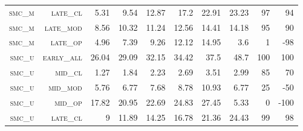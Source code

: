 \begin{landscape}
\begin{table}[!htbp]
\begin{tabular}{@{}rrrrrrr|rrr@{}}
\footnotesize \textsc{smc\_m}      & \footnotesize \textsc{late\_cl  }        & \footnotesize  5.31        & \footnotesize 9.54    & \footnotesize 12.87     & \footnotesize 17.2             & \footnotesize 22.91     & \footnotesize 23.23    & \footnotesize 97    & \footnotesize 94      \\
\footnotesize \textsc{smc\_m}      & \footnotesize \textsc{late\_mod }        & \footnotesize  8.56        & \footnotesize 10.32   & \footnotesize 11.24     & \footnotesize 12.56            & \footnotesize 14.41     & \footnotesize 14.18    & \footnotesize 95    & \footnotesize 90      \\
\footnotesize \textsc{smc\_m}      & \footnotesize \textsc{late\_op  }        & \footnotesize  4.96        & \footnotesize 7.39    & \footnotesize 9.26      & \footnotesize 12.12            & \footnotesize 14.95     & \footnotesize 3.6      & \footnotesize 1     & \footnotesize -98      \\
\footnotesize \textsc{smc\_u}      & \footnotesize \textsc{early\_all}        & \footnotesize  26.04       & \footnotesize 29.09   & \footnotesize 32.15     & \footnotesize 34.42            & \footnotesize 37.5      & \footnotesize 48.7     & \footnotesize 100   & \footnotesize 100      \\
\footnotesize \textsc{smc\_u}      & \footnotesize \textsc{mid\_cl   }        & \footnotesize  1.27        & \footnotesize 1.84    & \footnotesize 2.23      & \footnotesize 2.69             & \footnotesize 3.51      & \footnotesize 2.99     & \footnotesize 85    & \footnotesize 70       \\
\footnotesize \textsc{smc\_u}      & \footnotesize \textsc{mid\_mod  }        & \footnotesize  5.76        & \footnotesize 6.77    & \footnotesize 7.68      & \footnotesize 8.78             & \footnotesize 10.93     & \footnotesize 6.77     & \footnotesize 25    & \footnotesize -50    \\
\footnotesize \textsc{smc\_u}      & \footnotesize \textsc{mid\_op   }        & \footnotesize  17.82       & \footnotesize 20.95   & \footnotesize 22.69     & \footnotesize 24.83            & \footnotesize 27.45     & \footnotesize 5.33     & \footnotesize 0     & \footnotesize -100      \\
\footnotesize \textsc{smc\_u}      & \footnotesize \textsc{late\_cl  }        & \footnotesize  9           & \footnotesize 11.89   & \footnotesize 14.25     & \footnotesize 16.78            & \footnotesize 21.36     & \footnotesize 24.43    & \footnotesize 99    & \footnotesize 98      \\

\end{tabular}
\end{table}
\end{landscape}
